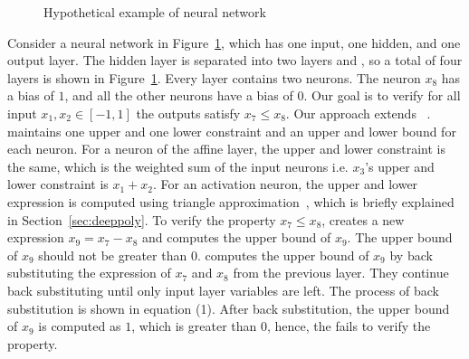 \begin{figure}[t]
	\centering
	\scalebox{0.8}{}
	\caption{Hypothetical example of neural network}
	\label{fig:motivating}
\end{figure}
Consider a neural network in Figure~\ref{fig:motivating},  which has one input, one hidden, and one output layer. The hidden layer is separated into two layers 
\affine{} and \relu{}, so a total of four layers is shown in Figure~\ref{fig:motivating}. 
Every layer contains two neurons. The neuron $x_8$ has a bias of $1$, and all the other neurons have a bias of $0$. 
Our goal is to verify for all input $x_1,x_2 \in [-1,1]$ the outputs satisfy $x_7 \leq x_8$. 
Our approach extends \deeppoly{}~\cite{singh2019abstract}.
\deeppoly{} maintains one upper and
one lower constraint and an upper and lower bound for each neuron.
For a neuron of the affine layer, the upper and lower constraint is 
the same, which is the weighted sum of the input neurons i.e. $x_3$'s upper and lower constraint is $x_1+x_2$.
For an activation neuron, the upper and lower expression is computed using triangle approximation~\cite{singh2019abstract}, 
which is briefly explained in Section~\ref{sec:deeppoly}. To verify the property $x_7 \leq x_8$, \deeppoly{} creates a 
new expression $x_9 = x_7 - x_8$ and computes the upper bound of $x_9$. The upper bound of $x_9$ should not be greater
than $0$. \deeppoly{} computes the upper bound of $x_9$ by back substituting the expression of $x_7$ and $x_8$ 
from the previous layer.
They continue back substituting until only input layer variables are left.
The process of back substitution is shown in equation (1). %
After back substitution, the upper bound of $x_9$ is
computed as $1$, which is greater than $0$, 
hence, the \deeppoly{} fails to verify the property.

